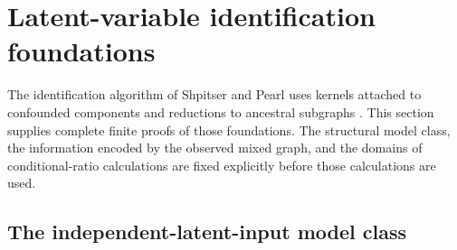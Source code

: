 \section{Latent-variable identification foundations}
\label{sec:p16-latent-identification-foundations}

The identification algorithm of Shpitser and Pearl uses kernels attached
to confounded components and reductions to ancestral subgraphs
\cite[Definitions~2--3 and Lemmas~4--8, pp.~1220--1224]{ShpitserPearl2006JointIdentification}.
This section supplies complete finite proofs of those foundations.
The structural model class, the information encoded by the observed
mixed graph, and the domains of conditional-ratio calculations are fixed
explicitly before those calculations are used.

\subsection{The independent-latent-input model class}

